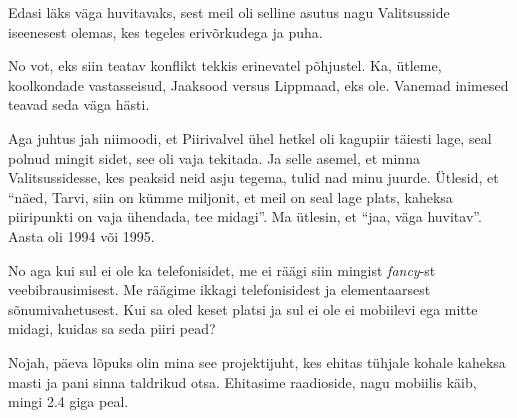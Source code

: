 Edasi läks väga huvitavaks, sest meil oli selline  asutus nagu Valitsusside iseenesest olemas, kes tegeles erivõrkudega ja puha.


No vot, eks siin teatav konflikt  tekkis erinevatel põhjustel. Ka, ütleme,  koolkondade vastasseisud,  Jaaksood versus Lippmaad, eks ole. Vanemad inimesed teavad seda väga hästi.

Aga juhtus jah niimoodi, et Piirivalvel ühel hetkel oli kagupiir täiesti lage, seal polnud mingit sidet, see oli vaja tekitada. Ja selle asemel, et minna Valitsussidesse, kes peaksid neid asju tegema, tulid nad minu juurde. Ütlesid, et \enquote{näed, Tarvi, siin on kümme miljonit, et meil on seal lage plats, kaheksa piiripunkti on vaja ühendada, tee midagi}. Ma ütlesin, et \enquote{jaa, väga huvitav}. Aasta oli 1994 või 1995.


No aga kui sul ei ole ka telefonisidet, me ei räägi siin mingist \emph{fancy}-st veebibrausimisest. Me räägime ikkagi telefonisidest ja elementaarsest sõnumivahetusest. Kui sa oled keset platsi ja sul ei ole ei mobiilevi ega mitte midagi, kuidas sa seda piiri pead?

Nojah, päeva lõpuks olin mina see projektijuht, kes ehitas tühjale kohale  kaheksa masti ja pani sinna taldrikud otsa. Ehitasime raadioside, nagu mobiilis käib, mingi 2.4 giga peal.


